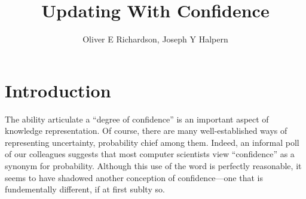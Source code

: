 \documentclass{article}
\title{Updating With Confidence}
\author{Oliver E Richardson, Joseph Y Halpern}
\begin{document}
\maketitle

\tableofcontents
\clearpage

\section{Introduction}

\def\stmt{$A$}


The ability articulate a ``degree of confidence'' is an important aspect of knowledge representation.
Of course, there are many well-established ways of representing uncertainty,
    probability chief among them.
Indeed, an informal poll of our colleagues suggests that most computer scientists view ``confidence'' as a synonym for probability.
Although this use of the word is perfectly reasonable, it seems to have shadowed another conception of confidence---one that is fundementally different, if at first sublty so. 
 
\end{document}
